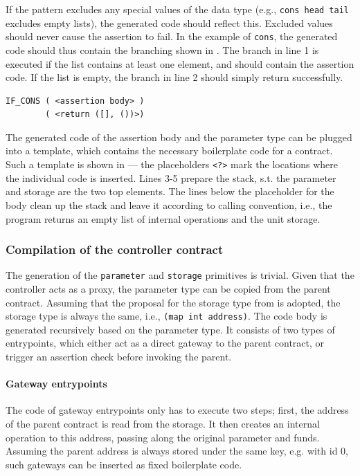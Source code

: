 If the pattern excludes any special values of the data type (e.g., \texttt{cons head tail} excludes empty lists), the generated code should reflect this. Excluded values should never cause the assertion to fail. In the example of \texttt{cons}, the generated code should thus contain the branching shown in . The branch in line 1 is executed if the list contains at least one element, and should contain the assertion code. If the list is empty, the branch in line 2 should simply return successfully. 
\begin{lstlisting}[language=Michelson, label=lst:cons, caption=Exclusion of empty lists in the assertion]
IF_CONS ( <assertion body> )
        ( <return ([], ())>)
\end{lstlisting}

The generated code of the assertion body and the parameter type can be plugged into a template, which contains the necessary boilerplate code for a contract. Such a template is shown in  --- the placeholders \texttt{<?>} mark the locations where the individual code is inserted. Lines 3-5 prepare the stack, s.t. the parameter and storage are the two top elements. The lines below the placeholder for the body clean up the stack and leave it according to calling convention, i.e., the program returns an empty list of internal operations and the unit storage.


\subsubsection{Compilation of the controller contract}
The generation of the \texttt{parameter} and \texttt{storage} primitives is trivial. Given that the controller acts as a proxy, the parameter type can be copied from the parent contract. Assuming that the proposal for the storage type from  is adopted, the storage type is always the same, i.e., \texttt{(map int address)}. The code body is generated recursively based on the parameter type. It consists of two types of entrypoints, which either act as a direct gateway to the parent contract, or trigger an assertion check before invoking the parent.

\paragraph{Gateway entrypoints}
The code of gateway entrypoints only has to execute two steps; first, the address of the parent contract is read from the storage. It then creates an internal operation to this address, passing along the original parameter and funds. Assuming the parent address is always stored under the same key, e.g. with id 0, such gateways can be inserted as fixed boilerplate code.

